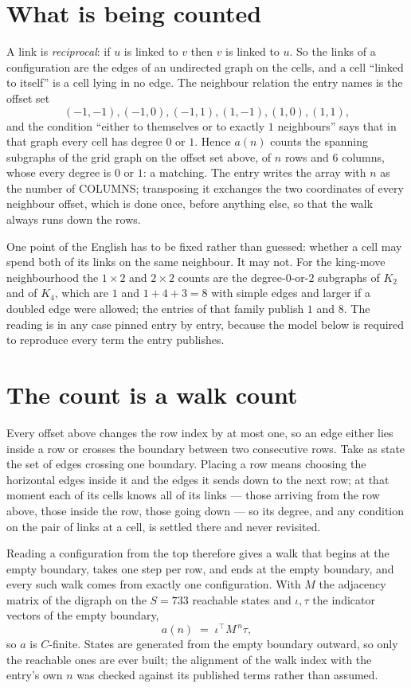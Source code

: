 \documentclass[11pt,a4paper]{article}
\theoremstyle{plain}
\theoremstyle{definition}
\begin{document}
\section{What is being counted}

A link is \emph{reciprocal}: if $u$ is linked to $v$ then $v$ is linked to $u$. So the links
of a configuration are the edges of an undirected graph on the cells, and a cell ``linked to
itself'' is a cell lying in no edge. The neighbour relation the entry names is the offset set
\[
(-1,-1), (-1,0), (-1,1), (1,-1), (1,0), (1,1),
\]
and the condition ``either to themselves or to exactly $1$ neighbours'' says that in that
graph every cell has degree $0$ or $1$. Hence $a(n)$ counts the spanning subgraphs of the
grid graph on the offset set above, of $n$ rows and $6$ columns,
whose every degree is $0$ or $1$: a matching. The entry writes the array with $n$ as the number of COLUMNS; transposing it exchanges the two coordinates of every neighbour offset, which is done once, before anything else, so that the walk always runs down the rows.

One point of the English has to be fixed rather than guessed: whether a cell may spend both of
its links on the same neighbour. It may not. For the king-move neighbourhood the $1\times2$
and $2\times2$ counts are the degree-$0$-or-$2$ subgraphs of $K_2$ and of $K_4$, which are $1$
and $1+4+3=8$ with simple edges and larger if a doubled edge were allowed; the entries of that
family publish $1$ and $8$. The reading is in any case pinned entry by entry, because the
model below is required to reproduce every term the entry publishes.


\section{The count is a walk count}

Every offset above changes the row index by at most one, so an edge either lies inside a row
or crosses the boundary between two consecutive rows. Take as state the set of edges crossing
one boundary. Placing a row means choosing the horizontal edges inside it and the edges it
sends down to the next row; at that moment each of its cells knows all of its links --- those
arriving from the row above, those inside the row, those going down --- so its degree, and any
condition on the pair of links at a cell, is settled there and never revisited.

Reading a configuration from the top therefore gives a walk that begins at the empty boundary,
takes one step per row, and ends at the empty boundary, and every such walk comes from exactly
one configuration. With $M$ the adjacency matrix of the digraph on the $S=733$ reachable
states and $\iota,\tau$ the indicator vectors of the empty boundary,
\[
a(n)\;=\;\iota^{\!\top}M^{\,n}\tau ,
\]
so $a$ is $C$-finite. States are generated from the empty boundary outward, so only the
reachable ones are ever built; the alignment of the walk index with the entry's own $n$ was
checked against its published terms rather than assumed.
\end{document}
